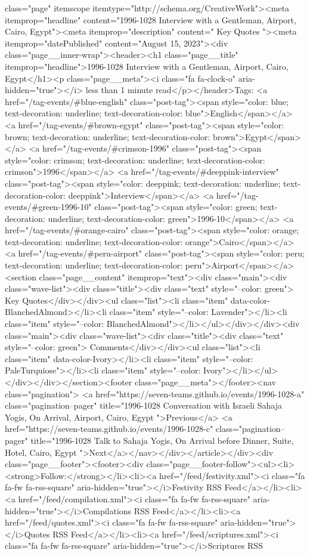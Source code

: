 class="page" itemscope itemtype="http://schema.org/CreativeWork"><meta itemprop="headline" content="1996-1028 Interview with a Gentleman, Airport, Cairo, Egypt"><meta itemprop="description" content=" Key Quotes "><meta itemprop="datePublished" content="August 15, 2023"><div class="page__inner-wrap"><header><h1 class="page__title" itemprop="headline">1996-1028 Interview with a Gentleman, Airport, Cairo, Egypt</h1><p class="page__meta"><i class="fa fa-clock-o" aria-hidden="true"></i> less than 1 minute read</p></header>Tags: <a href="/tag-events/#blue-english" class="post-tag"><span style="color: blue; text-decoration: underline; text-decoration-color: blue">English</span></a> <a href="/tag-events/#brown-egypt" class="post-tag"><span style="color: brown; text-decoration: underline; text-decoration-color: brown">Egypt</span></a> <a href="/tag-events/#crimson-1996" class="post-tag"><span style="color: crimson; text-decoration: underline; text-decoration-color: crimson">1996</span></a> <a href="/tag-events/#deeppink-interview" class="post-tag"><span style="color: deeppink; text-decoration: underline; text-decoration-color: deeppink">Interview</span></a> <a href="/tag-events/#green-1996-10" class="post-tag"><span style="color: green; text-decoration: underline; text-decoration-color: green">1996-10</span></a> <a href="/tag-events/#orange-cairo" class="post-tag"><span style="color: orange; text-decoration: underline; text-decoration-color: orange">Cairo</span></a> <a href="/tag-events/#peru-airport" class="post-tag"><span style="color: peru; text-decoration: underline; text-decoration-color: peru">Airport</span></a><section class="page__content" itemprop="text"><div class="main"><div class="wave-list"><div class="title"><div class="text" style="--color: green"> Key Quotes</div></div><ul class="list"><li class="item" data-color-BlanchedAlmond></li><li class="item" style="--color: Lavender"></li><li class="item" style="--color: BlanchedAlmond"></li></ul></div></div><div class="main"><div class="wave-list"><div class="title"><div class="text" style="--color: green"> Comments</div></div><ul class="list"><li class="item" data-color-Ivory></li><li class="item" style="--color: PaleTurquiose"></li><li class="item" style="--color: Ivory"></li></ul></div></div></section><footer class="page__meta"></footer><nav class="pagination"> <a href="https://seven-teams.github.io/events/1996-1028-a" class="pagination--pager" title="1996-1028 Conversation with Israeli Sahaja Yogis, On Arrival, Airport, Cairo, Egypt ">Previous</a> <a href="https://seven-teams.github.io/events/1996-1028-c" class="pagination--pager" title="1996-1028 Talk to Sahaja Yogis, On Arrival before Dinner, Suite, Hotel, Cairo, Egypt ">Next</a></nav></div></article></div><div class="page__footer"><footer><div class="page__footer-follow"><ul><li><strong>Follow:</strong></li><li><a href="/feed/festivity.xml"><i class="fa fa-fw fa-rss-square" aria-hidden="true"></i>Festivity RSS Feed</a></li><li><a href="/feed/compilation.xml"><i class="fa fa-fw fa-rss-square" aria-hidden="true"></i>Compilations RSS Feed</a></li><li><a href="/feed/quotes.xml"><i class="fa fa-fw fa-rss-square" aria-hidden="true"></i>Quotes RSS Feed</a></li><li><a href="/feed/scriptures.xml"><i class="fa fa-fw fa-rss-square" aria-hidden="true"></i>Scriptures RSS 